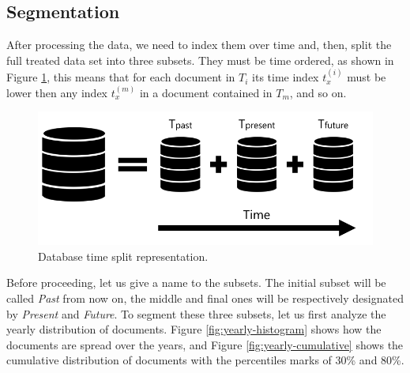 \subsection{Segmentation}

After processing the data, we need to index them over time and, then, split the full treated data set into three subsets. They must be time ordered, as shown in Figure \ref{fig:database}, this means that for each document in $T_{i}$ its time index $t_{x}^{(i)}$ must be lower then any index $t_{x}^{(m)}$ in a document contained in $T_{m}$, and so on.

\begin{figure}[h!]
	\centering
	\includegraphics[width=0.7\linewidth]{01.Chapters/04.Materials/database}
	\caption{Database time split representation.}
	\label{fig:database}
\end{figure}

Before proceeding, let us give a name to the subsets. The initial subset will be called \textit{Past} from now on, the middle and final ones will be respectively designated by \textit{Present} and \textit{Future}. To segment these three subsets, let us first analyze the yearly distribution of documents. Figure \ref{fig:yearly-histogram} shows how the documents are spread over the years, and Figure \ref{fig:yearly-cumulative} shows the cumulative distribution of documents with the percentiles marks of 30\% and 80\%.

